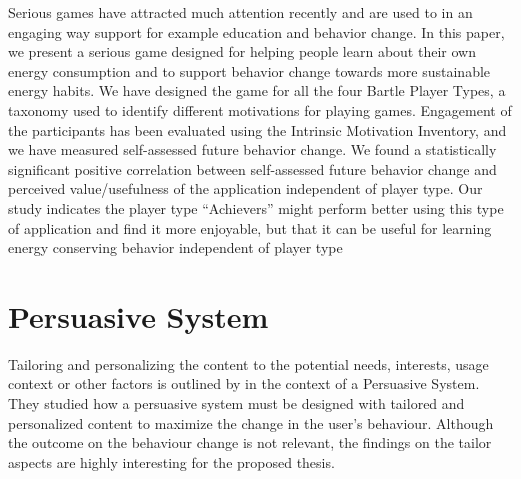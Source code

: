 Serious games have attracted much attention recently and are used to in an engaging way support for example education and behavior change. In this paper, we present a serious game designed for helping people learn about their own energy consumption and to support behavior change towards more sustainable energy habits. We have designed the game for all the four Bartle Player Types, a taxonomy used to identify different motivations for playing games. Engagement of the participants has been evaluated using the Intrinsic Motivation Inventory, and we have measured self-assessed future behavior change. We found a statistically significant positive correlation between self-assessed future behavior change and perceived value/usefulness of the application independent of player type. Our study indicates the player type “Achievers” might perform better using this type of application and find it more enjoyable, but that it can be useful for learning energy conserving behavior independent of player type


\section{Persuasive System}
Tailoring and personalizing the content to the potential needs, interests, usage context or other factors is outlined by \cite{oinas2009persuasive} in the context of a Persuasive System. They studied how a persuasive system must be designed with tailored and personalized content to maximize the change in the user's behaviour. Although the outcome on the behaviour change is not relevant, the findings on the tailor aspects are highly interesting for the proposed thesis.




